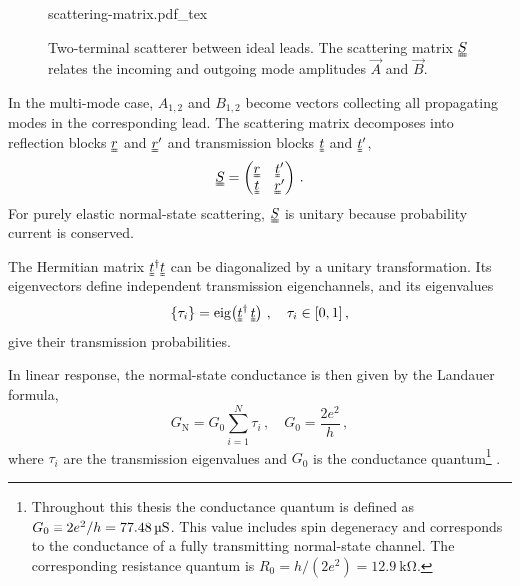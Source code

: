            \begin{figure}
                \captionsetup{format=plain}%
                \centering
                {scattering-matrix.pdf_tex}
                \caption{
                    Two-terminal scatterer between ideal leads. The scattering matrix $\mat{S}$ relates the incoming and outgoing mode amplitudes $\vec{A}$ and $\vec{B}$.
                }
                \label{fig:quasi:scatter}
            \end{figure}
            In the multi-mode case, $A_{1,2}$ and $B_{1,2}$ become vectors collecting all propagating modes in the corresponding lead. 
            The scattering matrix decomposes into reflection blocks $\mat{r}$ and $\mat{r}'$ and transmission blocks $\mat{t}$ and $\mat{t}'$,
            \begin{equation}
                \mat{S}
                = \begin{pmatrix} \mat{r} & \mat{t}' \\ \mat{t} & \mat{r}' \end{pmatrix}\,.
                \label{eq:meso:scattering-blocks}
            \end{equation}
            For purely elastic normal-state scattering, $\mat{S}$ is unitary because probability current is conserved.

            The Hermitian matrix $\mat{t}^\dagger\mat{t}$ can be diagonalized by a unitary transformation. Its eigenvectors define independent transmission eigenchannels, and its eigenvalues
            \begin{equation}
                \{\tau_i\} = \operatorname{eig}\!\left(\mat{t}^\dagger\,\mat{t}\right)\,,\quad
                \tau_i\in[0,1]\,,
                \label{eq:meso:transmission-eigenvalues}
            \end{equation}
            give their transmission probabilities.

            In linear response, the normal-state conductance is then given by the Landauer formula,
            \begin{equation}
                G_\mathrm{N} = G_0 \sum_{i=1}^N \tau_i\,,
                \quad
                G_0 = \frac{2e^2}{h}\,,
                \label{eq:meso:landauer}
            \end{equation}
            where $\tau_i$ are the transmission eigenvalues and $G_0$ is the conductance quantum\footnote{
                Throughout this thesis the conductance quantum is defined as $G_0 \sequiv 2e^2/h = \qty{77.48}{\micro\siemens}$. This value includes spin degeneracy and corresponds to the conductance of a fully transmitting normal-state channel. The corresponding resistance quantum is $R_0 = h/(2e^2) = \qty{12.9}{\kilo\ohm}$.
            } \cite{landauer_electrical_1970,buttiker_four-terminal_1986}.

